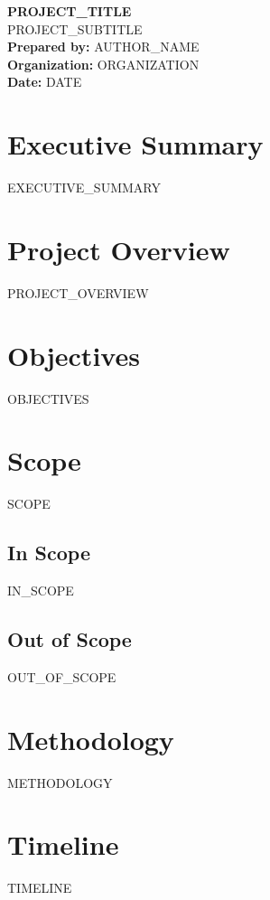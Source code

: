\documentclass[11pt,a4paper]{article}
\begin{document}
\begin{center}
    \vspace*{2cm}
    {\Huge\bfseries\color{primary} {{PROJECT_TITLE}}}\\[1em]
    {\Large {{PROJECT_SUBTITLE}}}\\[3em]

    {\large
    \textbf{Prepared by:} {{AUTHOR_NAME}}\\
    \textbf{Organization:} {{ORGANIZATION}}\\
    \textbf{Date:} {{DATE}}
    }
    \vspace{3cm}
\end{center}

\newpage

\section*{Executive Summary}
{{EXECUTIVE_SUMMARY}}

\section*{Project Overview}
{{PROJECT_OVERVIEW}}

\section*{Objectives}
{{OBJECTIVES}}

\section*{Scope}
{{SCOPE}}

\subsection*{In Scope}
{{IN_SCOPE}}

\subsection*{Out of Scope}
{{OUT_OF_SCOPE}}

\section*{Methodology}
{{METHODOLOGY}}

\section*{Timeline}
{{TIMELINE}}
\end{document}
